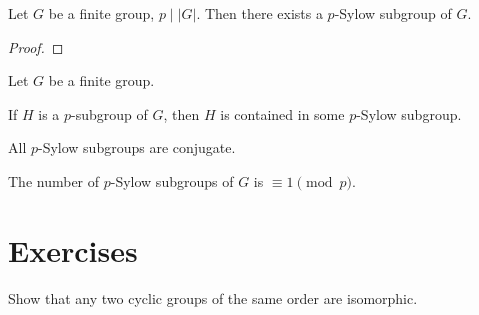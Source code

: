 \begin{theorem}[Sylow I]
Let $G$ be a finite group, $p\mid|G|$. Then there exists a $p$-Sylow subgroup of $G$.
\end{theorem}

\begin{proof}

\end{proof}



\begin{theorem}[Sylow II]
Let $G$ be a finite group.

If $H$ is a $p$-subgroup of $G$, then $H$ is contained in some $p$-Sylow subgroup.

All $p$-Sylow subgroups are conjugate. 
\end{theorem}

\begin{theorem}
The number of $p$-Sylow subgroups of $G$ is $\equiv1\pmod p$. 
\end{theorem}
\pagebreak

\section*{Exercises}
\begin{exercise}
Show that any two cyclic groups of the same order are isomorphic.
\end{exercise}

